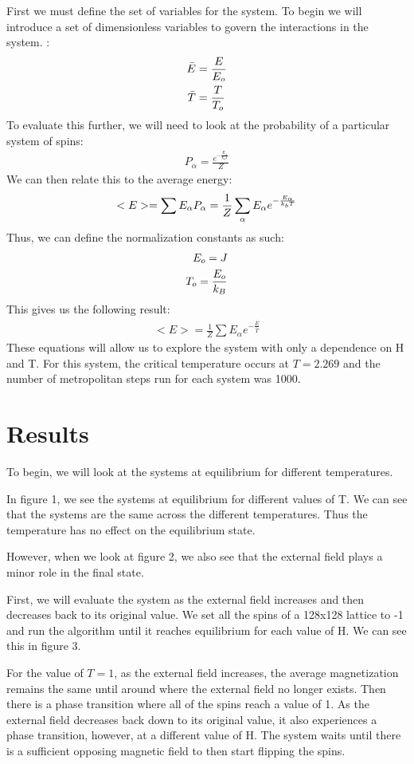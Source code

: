 \documentclass[pra,twocolumn,showpacs,amsmath,amssymb]{revtex4-2}
\begin{document}
First we must define the set of variables for the system. To begin we will introduce a set of dimensionless variables to govern the interactions in the system. :
\begin{align}
\bar{E} &= \frac{E}{E_o} \notag \\
\bar{T} &= \frac{T}{T_o} \notag
\end{align}
To evaluate this further, we will need to look at the probability of a particular system of spins:
\begin{align}
    P_\alpha = \frac{e^{-\frac{E_\alpha}{k_b T}}}{Z}
\end{align}
We can then relate this to the average energy:
\begin{align}
<E> = \sum E_\alpha P_\alpha = \frac{1}{Z} \sum_\alpha E_\alpha e^{-\frac{E_\alpha}{k_b T}} \notag
\end{align}
Thus, we can define the normalization constants as such:
\begin{align}
E_o = J \notag \\
T_o = \frac{E_o}{k_B} \notag
\end{align}
This gives us the following result:
\begin{align}
    <E> = \frac{1}{Z} \sum E_\alpha e^{-\frac{\bar{E}}{\bar{T}}}
\end{align}
These equations will allow us to explore the system with only a dependence on H and T. For this system, the critical temperature occurs at $T = 2.269$ and the number of metropolitan steps run for each system was 1000.

\section{Results} \label{sec:results}

To begin, we will look at the systems at equilibrium for different temperatures.
\par In figure 1, we see the systems at equilibrium for different values of T. We can see that the systems are the same across the different temperatures. Thus the temperature has no effect on the equilibrium state.
\par However, when we look at figure 2, we also see that the external field plays a minor role in the final state.
\par First, we will evaluate the system as the external field increases and then decreases back to its original value. We set all the spins of a 128x128 lattice to -1 and run the algorithm until it reaches equilibrium for each value of H. We can see this in figure 3.
\par For the value of $T = 1$, as the external field increases, the average magnetization remains the same until around where the external field no longer exists. Then there is a phase transition where all of the spins reach a value of 1. As the external field decreases back down to its original value, it also experiences a phase transition, however, at a different value of H. The system waits until there is a sufficient opposing magnetic field to then start flipping the spins.
\end{document}
